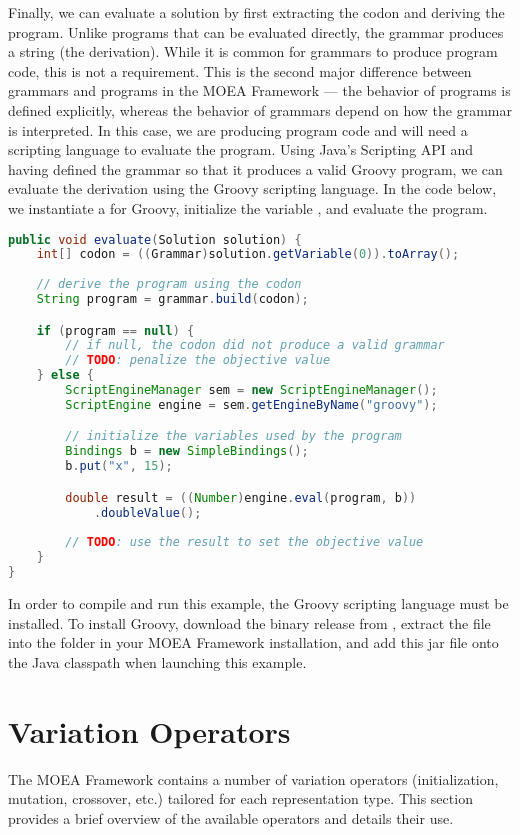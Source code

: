 Finally, we can evaluate a solution by first extracting the codon and deriving the program.  Unlike programs that can be evaluated directly, the grammar produces a string (the derivation).  While it is common for grammars to produce program code, this is not a requirement.  This is the second major difference between grammars and programs in the MOEA Framework --- the behavior of programs is defined explicitly, whereas the behavior of grammars depend on how the grammar is interpreted.  In this case, we are producing program code and will need a scripting language to evaluate the program.  Using Java's Scripting API and having defined the grammar so that it produces a valid Groovy program, we can evaluate the derivation using the Groovy scripting language.  In the code below, we instantiate a  for Groovy, initialize the variable , and evaluate the program.
\begin{lstlisting}[language=Java]
public void evaluate(Solution solution) {
    int[] codon = ((Grammar)solution.getVariable(0)).toArray();
    
    // derive the program using the codon
    String program = grammar.build(codon);

    if (program == null) {
        // if null, the codon did not produce a valid grammar
        // TODO: penalize the objective value
    } else {
        ScriptEngineManager sem = new ScriptEngineManager();
        ScriptEngine engine = sem.getEngineByName("groovy");

        // initialize the variables used by the program
        Bindings b = new SimpleBindings();
        b.put("x", 15);

        double result = ((Number)engine.eval(program, b))
            .doubleValue();
            
        // TODO: use the result to set the objective value
    }
}
\end{lstlisting}

In order to compile and run this example, the Groovy scripting language must be installed.  To install Groovy, download the binary release from , extract the  file into the  folder in your MOEA Framework installation, and add this jar file onto the Java classpath when launching this example.

\section{Variation Operators}
The MOEA Framework contains a number of variation operators (initialization, mutation, crossover, etc.) tailored for each representation type.  This section provides a brief overview of the available operators and details their use.

